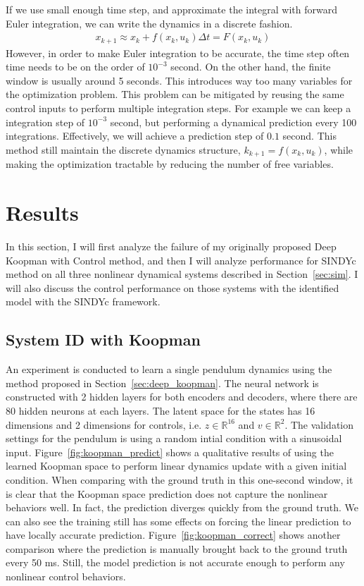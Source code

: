 \documentclass[10pt,twocolumn]{article}
\begin{document}
If we use small enough time step, and approximate the integral with forward Euler integration,
we can write the dynamics in a discrete fashion.
\begin{gather}
  x_{k+1} \approx x_k + f(x_k, u_k) \Delta t = F(x_k, u_k)
\end{gather}
However, in order to make Euler integration to be accurate, the time step often time needs to be
on the order of $10^{-3}$ second. On the other hand, the finite window is usually around 5 seconds.
This introduces way too many variables for the optimization problem. This problem can be
mitigated by reusing the same control inputs to perform multiple integration steps. For example
we can keep a integration step of $10^{-3}$ second, but performing a dynamical prediction
every 100 integrations. Effectively, we will achieve a prediction step of $0.1$ second. This
method still maintain the discrete dynamics structure, $k_{k+1} = f(x_k, u_k)$, while making
the optimization tractable by reducing the number of free variables.

\section{Results}

In this section, I will first analyze the failure of my originally proposed Deep Koopman with
Control method, and then I will analyze performance for SINDYc method
on all three nonlinear dynamical systems described in Section~\ref{sec:sim}. I will also discuss
the control performance on those systems with the identified model with the SINDYc framework.

\subsection{System ID with Koopman}

An experiment is conducted to learn a single pendulum dynamics using the method proposed
in Section~\ref{sec:deep_koopman}. The neural network is constructed with 2 hidden layers
for both encoders and decoders, where there are 80 hidden neurons at each layers. The
latent space for the states has 16 dimensions and 2 dimensions for controls, i.e.
$z \in \mathbb{R}^{16}$ and $v \in \mathbb{R}^2$. The validation settings for the pendulum
is using a random intial condition with a sinusoidal input. Figure~\ref{fig:koopman_predict}
shows a qualitative results of using the learned Koopman space to perform linear dynamics update
with a given initial condition. When comparing with the ground truth in this one-second window,
it is clear that the
Koopman space prediction does not capture the nonlinear behaviors well. In fact, the prediction
diverges quickly from the ground truth. We can also see the training still has some effects
on forcing the linear prediction to have locally accurate prediction.
Figure~\ref{fig:koopman_correct} shows another comparison where the prediction is manually
brought back to the ground truth every 50 ms. Still, the model prediction is not accurate enough
to perform any nonlinear control behaviors.
\end{document}
